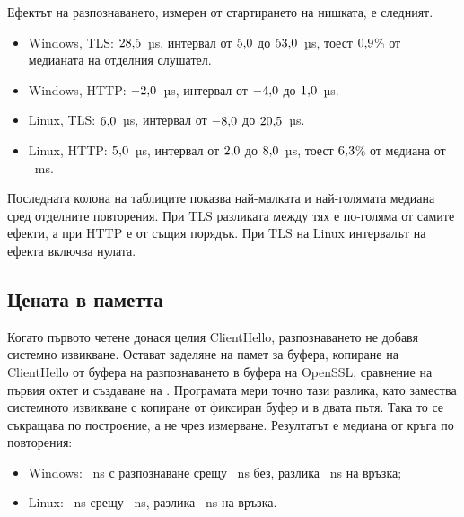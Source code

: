 \begin{table}[H]
\centering
\caption{Windows, време от стартирането на нишката до отговора (ms)}
\label{tab:win}
\small

\end{table}

\begin{table}[H]
\centering
\caption{Linux във WSL2, време от стартирането на нишката до отговора (ms)}
\label{tab:lin}
\small

\end{table}

Ефектът на разпознаването, измерен от стартирането на нишката, е следният.
\begin{itemize}
\item Windows, TLS: $28{,}5$~µs, интервал от $5{,}0$ до $53{,}0$~µs,
  тоест $0{,}9$\% от медианата на отделния слушател.
\item Windows, HTTP: $-2{,}0$~µs, интервал от $-4{,}0$ до
  $1{,}0$~µs.
\item Linux, TLS: $6{,}0$~µs, интервал от $-8{,}0$ до $20{,}5$~µs.
\item Linux, HTTP: $5{,}0$~µs, интервал от $2{,}0$ до
  $8{,}0$~µs, тоест $6{,}3$\% от медиана от
  \linClearDedicatedMedian{}~ms.
\end{itemize}

Последната колона на таблиците показва най-малката и най-голямата медиана сред
отделните повторения. При TLS разликата между тях е по-голяма от самите ефекти, а при
HTTP е от същия порядък. При TLS на Linux интервалът на ефекта включва нулата.

\subsection{Цената в паметта}

Когато първото четене донася целия ClientHello, разпознаването не добавя системно
извикване. Остават заделяне на памет за буфера, копиране на ClientHello от буфера на
разпознаването в буфера на OpenSSL, сравнение на първия октет и създаване на
. Програмата  мери точно тази разлика, като
замества системното извикване с копиране от фиксиран буфер и в двата пътя. Така то се
съкращава по построение, а не чрез измерване. Резултатът е медиана от
\microWinRounds{} кръга по \microWinIterations{} повторения:
\begin{itemize}
\item Windows: \microWinDetecting{}~ns с разпознаване срещу \microWinDedicated{}~ns без,
  разлика \microWinDiff{}~ns на връзка;
\item Linux: \microLinDetecting{}~ns срещу \microLinDedicated{}~ns, разлика
  \microLinDiff{}~ns на връзка.
\end{itemize}

